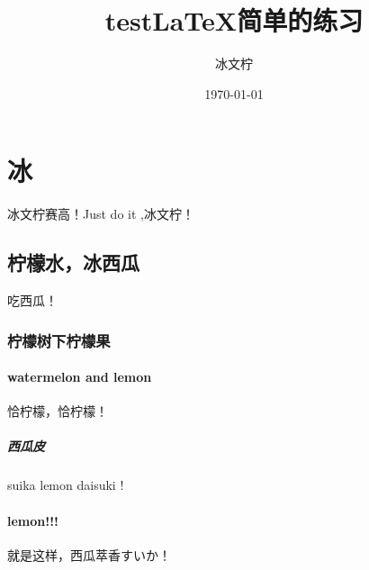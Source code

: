 \documentclass[UTF8]{ctexart}
\title{testLaTeX简单的练习}
\author{冰文柠}
\date{\today}
\begin{document}
\maketitle
\tableofcontents

\section{冰}
冰文柠赛高！Just do it ,冰文柠！
\subsection{柠檬水，冰西瓜}

吃西瓜！
\subsubsection{柠檬树下柠檬果}
\paragraph{watermelon and lemon}
恰柠檬，恰柠檬！
\subparagraph{西瓜皮}
suika lemon daisuki !
\paragraph{lemon!!!}

就是这样，西瓜萃香すいか！
\end{document}
